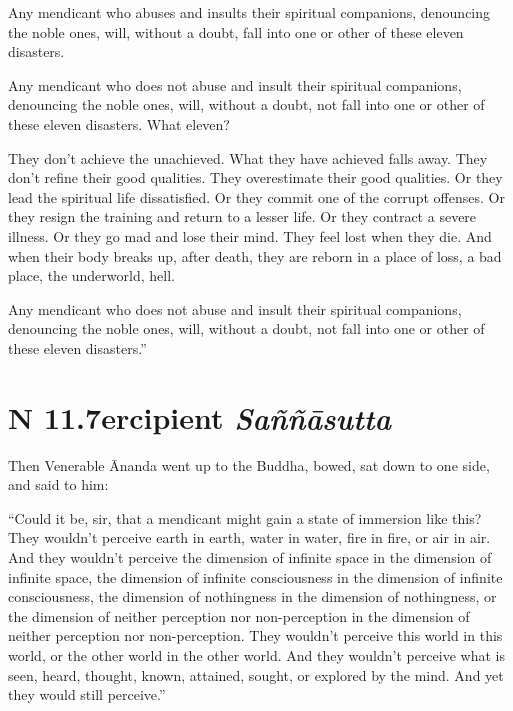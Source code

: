 \documentclass[12pt,openany]{book}%
\newcommand*{\suttatitleacronym}[1]{\smaller[2]{#1}\vspace*{.3em}}
\newcommand*{\suttatitletranslation}[1]{\linebreak{#1}}
\newcommand*{\suttatitleroot}[1]{\linebreak\smaller[2]\itshape{#1}}
\newcommand*{\tocacronym}[1]{\hspace*{-3.3em}{#1}\quad}
\newcommand*{\toctranslation}[1]{#1}
\newcommand*{\tocroot}[1]{(\textit{#1})}
\begin{document}
Any mendicant who abuses and insults their spiritual companions, denouncing the noble ones, will, without a doubt, fall into one or other of these eleven disasters. 

Any mendicant who does not abuse and insult their spiritual companions, denouncing the noble ones, will, without a doubt, not fall into one or other of these eleven disasters. What eleven? 

They don’t achieve the unachieved. What they have achieved falls away. They don’t refine their good qualities. They overestimate their good qualities. Or they lead the spiritual life dissatisfied. Or they commit one of the corrupt offenses. Or they resign the training and return to a lesser life. Or they contract a severe illness. Or they go mad and lose their mind. They feel lost when they die. And when their body breaks up, after death, they are reborn in a place of loss, a bad place, the underworld, hell. 

Any mendicant who does not abuse and insult their spiritual companions, denouncing the noble ones, will, without a doubt, not fall into one or other of these eleven disasters.” 

%
\section*{{\suttatitleacronym AN 11.7}{\suttatitletranslation Percipient }{\suttatitleroot Saññāsutta}}
\addcontentsline{toc}{section}{\tocacronym{AN 11.7} \toctranslation{Percipient } \tocroot{Saññāsutta}}

Then Venerable Ānanda went up to the Buddha, bowed, sat down to one side, and said to him: 

“Could it be, sir, that a mendicant might gain a state of immersion like this? They wouldn’t perceive earth in earth, water in water, fire in fire, or air in air. And they wouldn’t perceive the dimension of infinite space in the dimension of infinite space, the dimension of infinite consciousness in the dimension of infinite consciousness, the dimension of nothingness in the dimension of nothingness, or the dimension of neither perception nor non-perception in the dimension of neither perception nor non-perception. They wouldn’t perceive this world in this world, or the other world in the other world. And they wouldn’t perceive what is seen, heard, thought, known, attained, sought, or explored by the mind. And yet they would still perceive.” 
\end{document}
